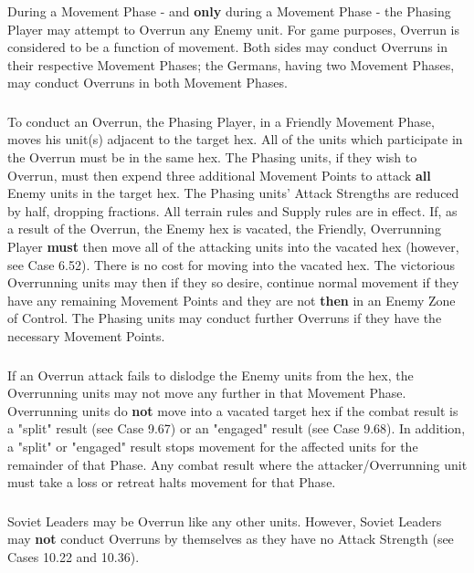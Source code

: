 During a Movement Phase - and \textbf{only} during a Movement Phase - the Phasing Player may attempt to Overrun any Enemy unit. For game purposes, Overrun is considered to be a function of movement. Both sides may conduct Overruns in their respective Movement Phases; the Germans, having two Movement Phases, may conduct Overruns in both Movement Phases.

\subsubsection{} To conduct an Overrun, the Phasing Player, in a Friendly Movement Phase, moves his unit(s) adjacent to the target hex. All of the units which participate in the Overrun must be in the same hex. The Phasing units, if they wish to Overrun, must then expend three additional Movement Points to attack \textbf{all} Enemy units in the target hex. The Phasing units' Attack Strengths are reduced by half, dropping fractions. All terrain rules and Supply rules are in effect. If, as a result of the Overrun, the Enemy hex is vacated, the Friendly, Overrunning Player \textbf{must} then move all of the attacking units into the vacated hex (however, see Case 6.52). There is no cost for moving into the vacated hex. The victorious Overrunning units may then if they so desire, continue normal movement if they have any remaining Movement Points and they are not \textbf{then} in an Enemy Zone of Control. The Phasing units may conduct further Overruns if they have the necessary Movement Points.

\subsubsection{} If an Overrun attack fails to dislodge the Enemy units from the hex, the Overrunning units may not move any further in that Movement Phase. Overrunning units do \textbf{not} move into a vacated target hex if the combat result is a "split" result (see Case 9.67) or an "engaged" result (see Case 9.68). In addition, a "split" or "engaged" result stops movement for the affected units for the remainder of that Phase. Any combat result where the attacker/Overrunning unit must take a loss or retreat halts movement for that Phase.

\subsubsection{} Soviet Leaders may be Overrun like any other units. However, Soviet Leaders may \textbf{not} conduct Overruns by themselves as they have no Attack Strength (see Cases 10.22 and 10.36).

